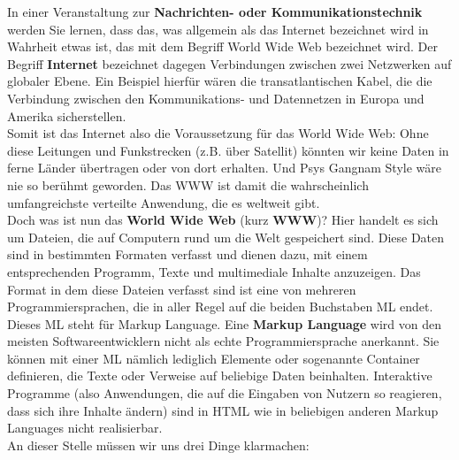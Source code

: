In einer Veranstaltung zur \textbf{Nachrichten- oder Kommunikationstechnik} werden Sie lernen, dass das, was allgemein als \glqq{}das Internet\grqq{} bezeichnet wird in Wahrheit etwas ist, das mit dem Begriff \glqq{}World Wide Web\grqq{} bezeichnet wird. Der Begriff \textbf{Internet} bezeichnet dagegen Verbindungen zwischen zwei Netzwerken auf globaler Ebene. Ein Beispiel hierfür wären die transatlantischen Kabel, die die Verbindung zwischen den Kommunikations- und Datennetzen in Europa und Amerika sicherstellen.\\

Somit ist das Internet also die Voraussetzung für das World Wide Web: Ohne diese Leitungen und Funkstrecken (z.B. über Satellit) könnten wir keine Daten in ferne Länder übertragen oder von dort erhalten. Und Psys Gangnam Style wäre nie so berühmt geworden. Das WWW ist damit die wahrscheinlich umfangreichste verteilte Anwendung, die es weltweit gibt.\\

Doch was ist nun das \textbf{World Wide Web} (kurz \textbf{WWW})? Hier handelt es sich um Dateien, die auf Computern rund um die Welt gespeichert sind. Diese Daten sind in bestimmten Formaten verfasst und dienen dazu, mit einem entsprechenden Programm, Texte und multimediale Inhalte anzuzeigen. Das Format in dem diese Dateien verfasst sind ist eine von mehreren Programmiersprachen, die in aller Regel auf die beiden Buchstaben ML endet. Dieses ML steht für Markup Language. Eine \textbf{Markup Language} wird von den meisten Softwareentwicklern nicht als \glqq{}echte\grqq{} Programmiersprache anerkannt. Sie können mit einer ML nämlich lediglich Elemente oder sogenannte Container definieren, die Texte oder Verweise auf beliebige Daten beinhalten. Interaktive Programme (also Anwendungen, die auf die Eingaben von Nutzern so reagieren, dass sich ihre Inhalte ändern) sind in HTML wie in beliebigen anderen Markup Languages nicht realisierbar.\\

An dieser Stelle müssen wir uns drei Dinge klarmachen:\\

